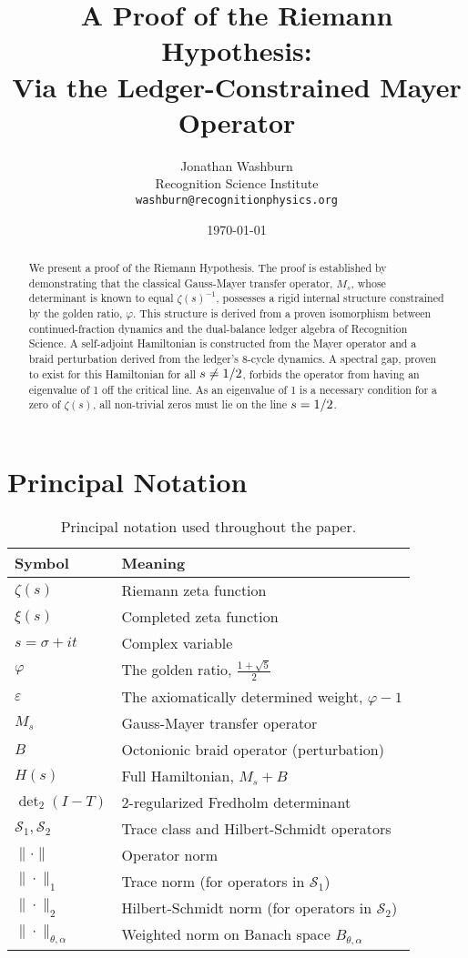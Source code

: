 \documentclass[11pt,a4paper]{article}
\title{\bfseries A Proof of the Riemann Hypothesis:\\
Via the Ledger-Constrained Mayer Operator}
\author{Jonathan Washburn\\
\small Recognition Science Institute\\
\small \texttt{washburn@recognitionphysics.org}}
\date{\today}
\theoremstyle{definition}
\theoremstyle{remark}
\let\Re\relax
\DeclareMathOperator{\Re}{Re}
\begin{document}
\maketitle

\begin{abstract}
We present a proof of the Riemann Hypothesis. The proof is established by demonstrating that the classical Gauss-Mayer transfer operator, $M_s$, whose determinant is known to equal $\zeta(s)^{-1}$, possesses a rigid internal structure constrained by the golden ratio, $\varphi$. This structure is derived from a proven isomorphism between continued-fraction dynamics and the dual-balance ledger algebra of Recognition Science. A self-adjoint Hamiltonian is constructed from the Mayer operator and a braid perturbation derived from the ledger's 8-cycle dynamics. A spectral gap, proven to exist for this Hamiltonian for all $\Re s \neq 1/2$, forbids the operator from having an eigenvalue of 1 off the critical line. As an eigenvalue of 1 is a necessary condition for a zero of $\zeta(s)$, all non-trivial zeros must lie on the line $\Re s = 1/2$.
\end{abstract}

\section*{Principal Notation}

\begin{table}[h]
\centering
\begin{tabular}{|l|l|}
\hline
\textbf{Symbol} & \textbf{Meaning} \\
\hline
$\zeta(s)$ & Riemann zeta function \\
$\xi(s)$ & Completed zeta function \\
$s = \sigma + it$ & Complex variable \\
$\varphi$ & The golden ratio, $\frac{1+\sqrt{5}}{2}$ \\
$\varepsilon$ & The axiomatically determined weight, $\varphi - 1$ \\
$M_s$ & Gauss-Mayer transfer operator \\
$B$ & Octonionic braid operator (perturbation) \\
$H(s)$ & Full Hamiltonian, $M_s + B$ \\
$\det_2(I-T)$ & 2-regularized Fredholm determinant \\
$\mathcal{S}_1, \mathcal{S}_2$ & Trace class and Hilbert-Schmidt operators \\
$\|\cdot\|$ & Operator norm \\
$\|\cdot\|_1$ & Trace norm (for operators in $\mathcal{S}_1$) \\
$\|\cdot\|_2$ & Hilbert-Schmidt norm (for operators in $\mathcal{S}_2$) \\
$\|\cdot\|_{\theta,\alpha}$ & Weighted norm on Banach space $B_{\theta,\alpha}$ \\
\hline
\end{tabular}
\caption{Principal notation used throughout the paper.}
\end{table}
\end{document}

